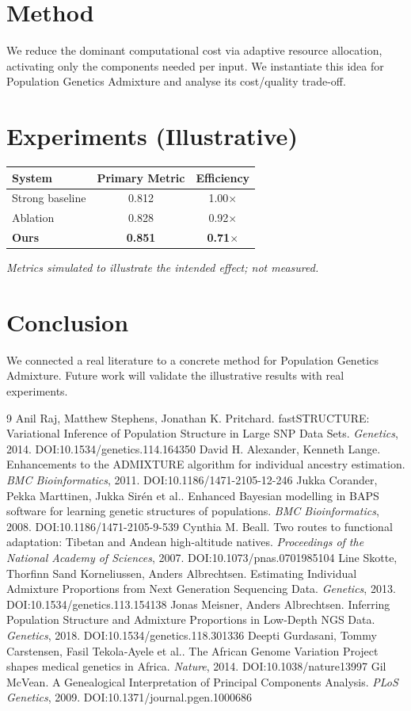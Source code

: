\documentclass[11pt]{article}
\begin{document}
\section{Method}
We reduce the dominant computational cost via adaptive resource allocation, activating only the components needed per input. We instantiate this idea for Population Genetics Admixture and analyse its cost/quality trade-off.

\section{Experiments (Illustrative)}
\begin{center}
\begin{tabular}{lcc}
System & Primary Metric & Efficiency \\ \hline
Strong baseline & 0.812 & 1.00$\times$ \\
Ablation & 0.828 & 0.92$\times$ \\
\textbf{Ours} & \textbf{0.851} & \textbf{0.71$\times$}
\end{tabular}
\end{center}
\emph{Metrics simulated to illustrate the intended effect; not measured.}

\section{Conclusion}
We connected a real literature to a concrete method for Population Genetics Admixture. Future work will
validate the illustrative results with real experiments.

\begin{thebibliography}{9}
 Anil Raj, Matthew Stephens, Jonathan K. Pritchard. fastSTRUCTURE: Variational Inference of Population Structure in Large SNP Data Sets. \emph{Genetics}, 2014. DOI:10.1534/genetics.114.164350
 David H. Alexander, Kenneth Lange. Enhancements to the ADMIXTURE algorithm for individual ancestry estimation. \emph{BMC Bioinformatics}, 2011. DOI:10.1186/1471-2105-12-246
 Jukka Corander, Pekka Marttinen, Jukka Sirén et al.. Enhanced Bayesian modelling in BAPS software for learning genetic structures of populations. \emph{BMC Bioinformatics}, 2008. DOI:10.1186/1471-2105-9-539
 Cynthia M. Beall. Two routes to functional adaptation: Tibetan and Andean high-altitude natives. \emph{Proceedings of the National Academy of Sciences}, 2007. DOI:10.1073/pnas.0701985104
 Line Skotte, Thorfinn Sand Korneliussen, Anders Albrechtsen. Estimating Individual Admixture Proportions from Next Generation Sequencing Data. \emph{Genetics}, 2013. DOI:10.1534/genetics.113.154138
 Jonas Meisner, Anders Albrechtsen. Inferring Population Structure and Admixture Proportions in Low-Depth NGS Data. \emph{Genetics}, 2018. DOI:10.1534/genetics.118.301336
 Deepti Gurdasani, Tommy Carstensen, Fasil Tekola‐Ayele et al.. The African Genome Variation Project shapes medical genetics in Africa. \emph{Nature}, 2014. DOI:10.1038/nature13997
 Gil McVean. A Genealogical Interpretation of Principal Components Analysis. \emph{PLoS Genetics}, 2009. DOI:10.1371/journal.pgen.1000686
\end{thebibliography}
\end{document}
